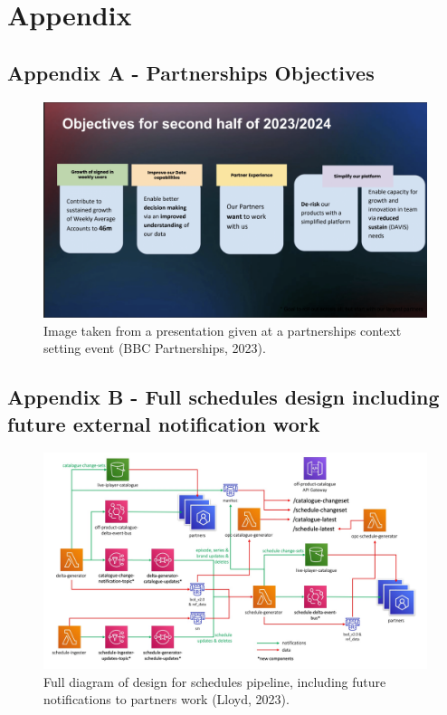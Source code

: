 \section{Appendix}

  \subsection{Appendix A - Partnerships Objectives}
    \label{sec:AppendixA}
    \begin{figure}[H]
      \centering
      \includegraphics[width=12cm]{assets/appendix/partnershipsObjectives.png}
      \caption{Image taken from a presentation given at a partnerships context setting event (BBC Partnerships, 2023).}
      \label{fig:partnershipsObjectives}
    \end{figure}

  \newpage
  \subsection{Appendix B - Full schedules design including future external notification work}
    \label{sec:AppendixB}
    \begin{figure}[H]
      \centering
      \includegraphics[width=12cm]{assets/appendix/initialDesign.jpg}
      \caption{Full diagram of design for schedules pipeline, including future notifications to partners work (Lloyd, 2023).}
      \label{fig:fullSpikeDesign}
    \end{figure}


